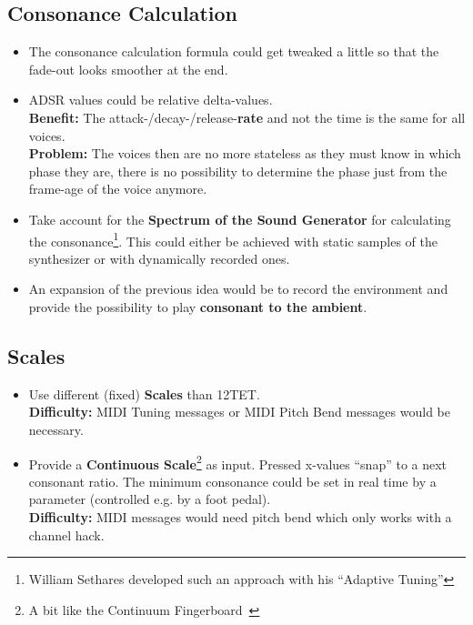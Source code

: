 \documentclass[12pt,a4paper,titlepage,oneside]{report}
\begin{document}
\subsection{Consonance Calculation}

\begin{itemize}

	\item The consonance calculation formula could get tweaked a little so that the fade-out looks smoother at the end.

	\item ADSR values could be relative delta-values. \\
	\textbf{Benefit:} The attack-/decay-/release-\textbf{rate} and not the time is the same for all voices. \\
	\textbf{Problem:} The voices then are no more stateless as they must know in which phase they are, there is no possibility to determine the phase just from the frame-age of the voice anymore.

	\item Take account for the \textbf{Spectrum of the Sound Generator} for calculating the consonance\footnote{William Sethares developed such an approach with his ``Adaptive Tuning''}. This could either be achieved with static samples of the synthesizer or with dynamically recorded ones.

	\item An expansion of the previous idea would be to record the environment and provide the possibility to play \textbf{consonant to the ambient}.

\end{itemize}


\subsection{Scales}

\begin{itemize}

	\item Use different (fixed) \textbf{Scales} than 12TET. \\
	\textbf{Difficulty:} MIDI Tuning messages or MIDI Pitch Bend messages would be necessary.

	\item Provide a \textbf{Continuous Scale}\footnote{A bit like the Continuum Fingerboard~\cite{bib:continuum}} as input. Pressed x-values ``snap'' to a next consonant ratio. The minimum consonance could be set in real time by a parameter (controlled e.g. by a foot pedal). \\
	\textbf{Difficulty:} MIDI messages would need pitch bend which only works with a channel hack.

\end{itemize}
\end{document}
